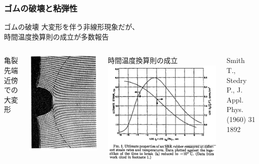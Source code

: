 \documentclass[12pt, dvipdfmx]{beamer}
\begin{document}
\begin{frame}
	\frametitle{ゴムの破壊と粘弾性}
		\begin{alertblock}{ゴムの破壊}
			大変形を伴う非線形現象だが、\\時間温度換算則の成立が多数報告
		\end{alertblock}
		\vspace{2mm}
		\begin{columns}[T, totalwidth=\textwidth]
				亀裂先端近傍での大変形
				\vspace{-3mm}
				\begin{center}
					\includegraphics[width=.6\textwidth]{rubber_crack.png}
				\end{center}
				時間温度換算則の成立
				\includegraphics[width=.8\textwidth]{Time_Temp_2.png}

				{\tiny Smith T., Stedry P., J. Appl. Phys. (1960) 31 1892}
		\end{columns}
\end{frame}
\end{document}

